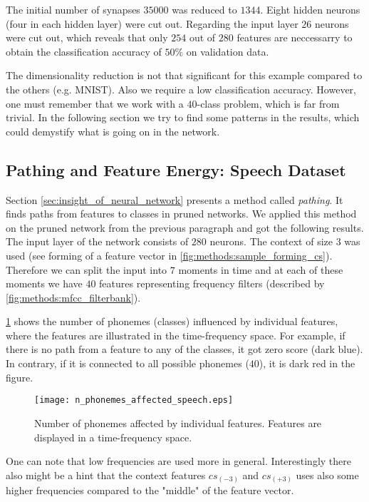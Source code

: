 The initial number of synapses $ 35000 $ was reduced to $ 1344 $. Eight hidden neurons (four in each hidden layer) were cut out. Regarding the input layer $ 26 $ neurons were cut out, which reveals that only $ 254 $ out of $ 280 $ features are neccessarry to obtain the classification accuracy of $ 50\% $ on validation data.

The dimensionality reduction is not that significant for this example compared to the others (e.g. MNIST). Also we require a low classification accuracy. However, one must remember that we work with a $ 40 $-class problem, which is far from trivial. In the following section we try to find some patterns in the results, which could demystify what is going on in the network.

\subsection*{Pathing and Feature Energy: Speech Dataset}
Section \ref{sec:insight_of_neural_network} presents a method called \textit{pathing}. It finds paths from features to classes in pruned networks. We applied this method on the pruned network from the previous paragraph and got the following results. The input layer of the network consists of $ 280 $ neurons. The context of size $ 3 $ was used (see forming of a feature vector in \cref{fig:methods:sample_forming_cs}). Therefore we can split the input into $ 7 $ moments in time and at each of these moments we have $ 40 $ features representing frequency filters (described by \cref{fig:methods:mfcc_filterbank}).

\cref{fig:examples:speech_n_phonemes_affected} shows the number of phonemes (classes) influenced by individual features, where the features are illustrated in the time-frequency space. For example, if there is no path from a feature to any of the classes, it got zero score (dark blue). In contrary, if it is connected to all possible phonemes ($ 40 $), it is dark red in the figure.

\begin{figure}[H]
\centering
\texttt{[image: n\_phonemes\_affected\_speech.eps]}
\caption{Number of phonemes affected by individual features. Features are displayed in a time-frequency space.}
\label{fig:examples:speech_n_phonemes_affected}
\end{figure}

One can note that low frequencies are used more in general. Interestingly there also might be a hint that the context features $ cs_{(-3)} $ and $ cs_{(+3)} $ uses also some higher frequencies compared to the "middle" of the feature vector.

